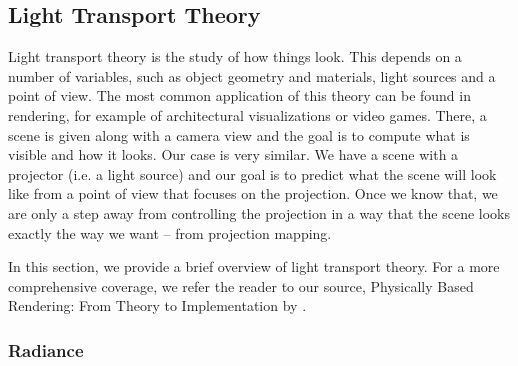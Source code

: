 

\subsection{Light Transport Theory}
\label{section:background-projection_mapping-light_transport}

Light transport theory is the study of how things look. This depends on a number of variables, such as object geometry and materials, light sources and a point of view. The most common application of this theory can be found in rendering, for example of architectural visualizations or video games. There, a scene is given along with a camera view and the goal is to compute what is visible and how it looks. Our case is very similar. We have a scene with a projector (i.e. a light source) and our goal is to predict what the scene will look like from a point of view that focuses on the projection. Once we know that, we are only a step away from controlling the projection in a way that the scene looks exactly the way we want -- from projection mapping.

In this section, we provide a brief overview of light transport theory. For a more comprehensive coverage, we refer the reader to our source, Physically Based Rendering: From Theory to Implementation by \citet{PBRT3e}.

\subsubsection{Radiance}
\label{section:background-projection_mapping-light_transport-radiance}

